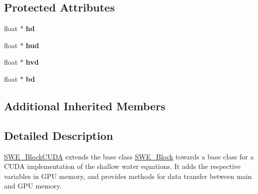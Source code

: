 \subsection*{Protected Attributes}
\begin{DoxyCompactItemize}
\item 
\hypertarget{classSWE__BlockCUDA_a9c6a44214a75a9f5d4f8bb3806eaaf71}{float $\ast$ {\bfseries hd}}\label{classSWE__BlockCUDA_a9c6a44214a75a9f5d4f8bb3806eaaf71}

\item 
\hypertarget{classSWE__BlockCUDA_a2fb123601bbf091876dcccc351157c67}{float $\ast$ {\bfseries hud}}\label{classSWE__BlockCUDA_a2fb123601bbf091876dcccc351157c67}

\item 
\hypertarget{classSWE__BlockCUDA_a795fe87f7abfa7e6511232e03a808705}{float $\ast$ {\bfseries hvd}}\label{classSWE__BlockCUDA_a795fe87f7abfa7e6511232e03a808705}

\item 
\hypertarget{classSWE__BlockCUDA_ae08ee1752690e828a9e0470a3c55fb39}{float $\ast$ {\bfseries bd}}\label{classSWE__BlockCUDA_ae08ee1752690e828a9e0470a3c55fb39}

\end{DoxyCompactItemize}
\subsection*{Additional Inherited Members}


\subsection{Detailed Description}
\hyperlink{classSWE__BlockCUDA}{S\-W\-E\-\_\-\-Block\-C\-U\-D\-A} extends the base class \hyperlink{classSWE__Block}{S\-W\-E\-\_\-\-Block} towards a base class for a C\-U\-D\-A implementation of the shallow water equations. It adds the respective variables in G\-P\-U memory, and provides methods for data transfer between main and G\-P\-U memory. 

